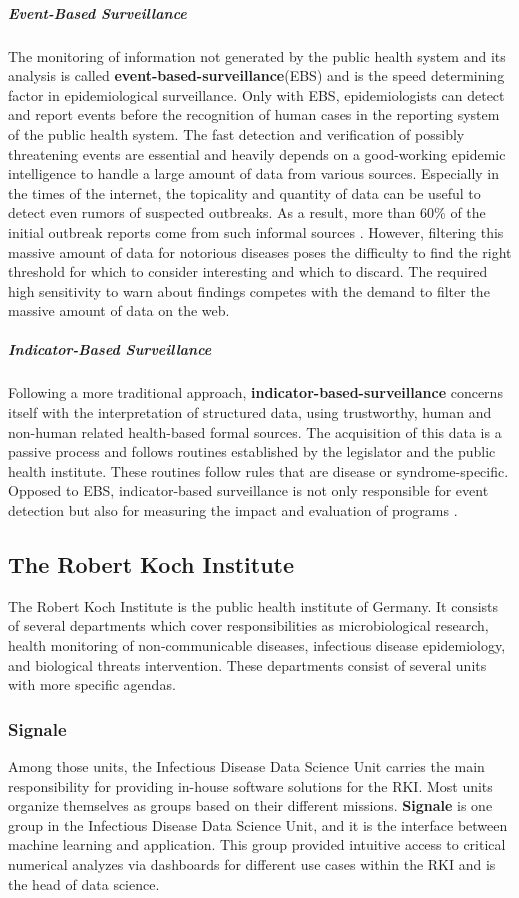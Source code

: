 \subparagraph{Event-Based Surveillance}
The monitoring of information not generated by the public health system and its analysis is called \textbf{event-based-surveillance}(\gls{EBS}) and is the speed determining factor in epidemiological surveillance.
Only with EBS, epidemiologists can detect and report events before the recognition of human cases in the reporting system of the public health system\citep{EarlyDetection}.
The fast detection and verification of possibly threatening events are essential and heavily depends on a good-working epidemic intelligence to handle a large amount of data from various sources.
Especially in the times of the internet, the topicality and quantity of data can be useful to detect even rumors of suspected outbreaks.
As a result, more than 60\% of the initial outbreak reports come from such informal sources \citep{EpiSurv}.
However, filtering this massive amount of data for notorious diseases poses the difficulty to find the right threshold for which to consider interesting and which to discard.
The required high sensitivity to warn about findings competes with the demand to filter the massive amount of data on the web.

\subparagraph{Indicator-Based Surveillance}
Following a more traditional approach, \textbf{indicator-based-surveillance} concerns itself with the interpretation of structured data, using trustworthy, human and non-human related health-based formal sources\citep{EarlyDetection}.
The acquisition of this data is a passive process and follows routines established by the legislator and the public health institute.
These routines follow rules that are disease or syndrome-specific.
Opposed to EBS, indicator-based surveillance is not only responsible for event detection but also for measuring the impact and evaluation of programs \citep{EarlyDetection}.


\subsection{The Robert Koch Institute}
The Robert Koch Institute is the public health institute of Germany.
It consists of several departments which cover responsibilities as microbiological research, health monitoring of non-communicable diseases, infectious disease epidemiology, and biological threats intervention.
These departments consist of several units with more specific agendas.

\subsubsection{Signale}
Among those units, the Infectious Disease Data Science Unit carries the main responsibility for providing in-house software solutions for the RKI.
Most units organize themselves as groups based on their different missions.
\textbf{Signale} is one group in the Infectious Disease Data Science Unit, and it is the interface between machine learning and application.
This group provided intuitive access to critical numerical analyzes via dashboards for different use cases within the RKI and is the head of data science.


